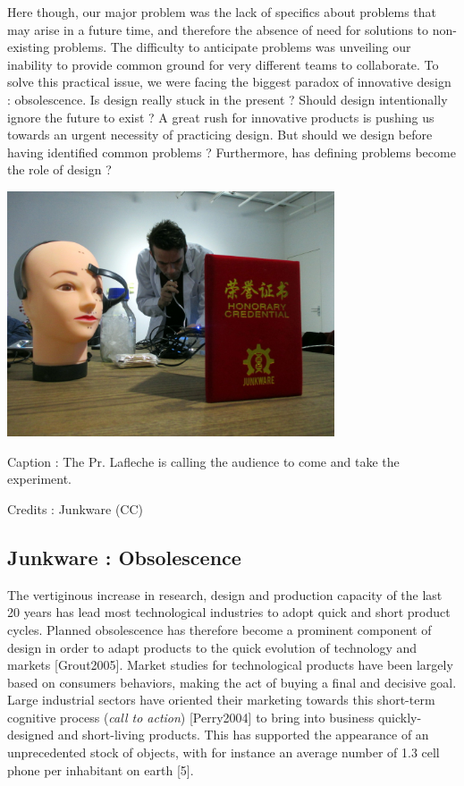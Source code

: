 \bigskip

Here though, our major problem was the lack of specifics about problems
that may arise in a future time, and therefore the absence of need for
solutions to non-existing problems. The difficulty to anticipate
problems was unveiling our inability to provide common ground for very
different teams to collaborate. To solve this practical issue, we were
facing the biggest paradox of innovative design : obsolescence. Is
design really stuck in the present ? Should design intentionally ignore
the future to exist ? A great rush for innovative products is pushing
us towards an urgent necessity of practicing design. But should we
design before having identified common problems ? Furthermore, has
defining problems become the role of design ?


\bigskip



\begin{center}
\includegraphics[width=3.8083in,height=2.8563in]{images/junkware-img1.jpg}
\end{center}
{\centering
Caption : The Pr. Lafleche is calling the audience to come and take the
experiment. 
\par}

{\centering
Credits : Junkware (CC)
\par}

\subsection[Junkware : Obsolescence ]{Junkware : Obsolescence }
The vertiginous increase in research, design and production capacity of
the last 20 years has lead most technological industries to adopt quick
and short product cycles. Planned obsolescence has therefore become a
prominent component of design in order to adapt products to the quick
evolution of technology and markets [Grout2005]. Market studies for
technological products have been largely based on consumers behaviors,
making the act of buying a final and decisive goal. Large industrial
sectors have oriented their marketing towards this short-term cognitive
process (\textit{call to action}) [Perry2004] to bring into business
quickly-designed and short-living products. This has supported the
appearance of an unprecedented stock of objects, with for instance an
average number of 1.3 cell phone per inhabitant on earth [5].


